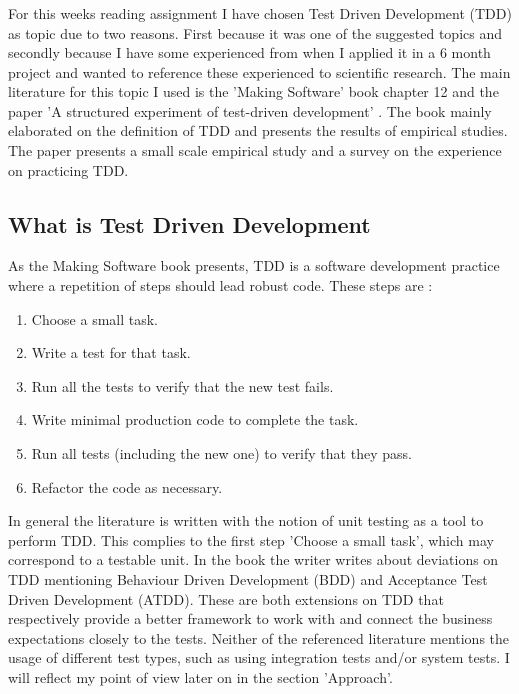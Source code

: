 \subsubsection*{}
For this weeks reading assignment I have chosen Test Driven Development (TDD) as topic due to two reasons. First because
it was one of the suggested topics and secondly because I have some experienced from when I applied it in a 6 month project
and wanted to reference these experienced to scientific research. The main literature for this topic I used is the 'Making Software' \autocite{MAKING_SOFTWARE}
book chapter 12 and the paper 'A structured experiment of test-driven development' \autocite{SAC-J-2003-GeorgeW04}.
The book mainly elaborated on the definition of TDD and presents the results of empirical studies. The paper presents a
small scale empirical study and a survey on the experience on practicing TDD.

\subsection*{What is Test Driven Development}

As the Making Software book presents, TDD is a software development practice where a repetition of steps should lead
robust code. These steps are \autocite[208]{MAKING_SOFTWARE}:

\begin{enumerate}
  \item Choose a small task.
  \item Write a test for that task.
  \item Run all the tests to verify that the new test fails.
  \item Write minimal production code to complete the task.
  \item Run all tests (including the new one) to verify that they pass.
  \item Refactor the code as necessary.
\end{enumerate}

In general the literature is written with the notion of unit testing as a tool to perform TDD. This complies to the
first step 'Choose a small task', which may correspond to a testable unit. In the book the writer writes about
deviations on TDD mentioning Behaviour Driven Development (BDD) and Acceptance Test Driven Development (ATDD). These
are both extensions on TDD that respectively provide a better framework to work with and connect the business
expectations closely to the tests. Neither of the referenced literature mentions the usage of different test types,
such as using integration tests and/or system tests. I will reflect my point of view later on in the section
'Approach'.


